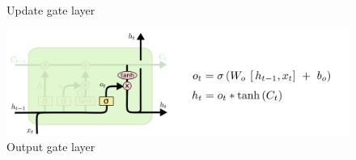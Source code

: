 \begin{frame}[allowframebreaks]
\begin{figure}[htp]
        \caption{Update gate layer}
    \end{figure}
    \begin{figure}[htp]
        \centering
        \includegraphics[width=\textwidth]{images/v1survey/LSTM-4.png}
        \caption{Output gate layer}
    \end{figure}
\end{frame}